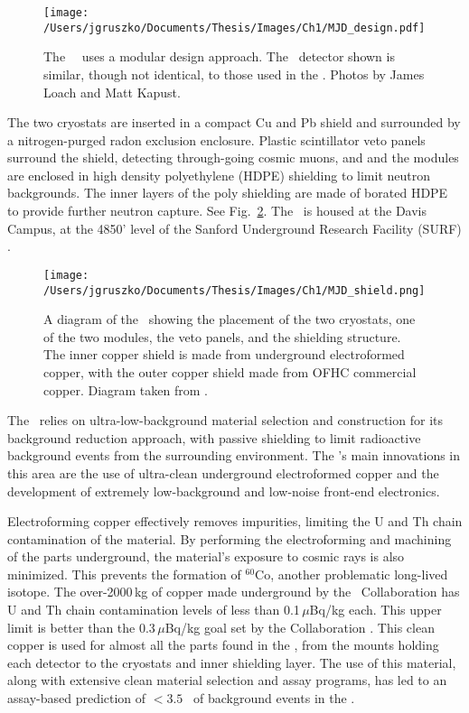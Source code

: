 \begin{figure}[t]
\centering
\texttt{[image: /Users/jgruszko/Documents/Thesis/Images/Ch1/MJD\_design.pdf]}
\caption[The modular elements of the \DEM\ design]{The \MJ\ \DEM\ uses a modular design approach. The \ppc\ detector shown is similar, though not identical, to those used in the \DEM. Photos by James Loach and Matt Kapust.}
\label{fig:MJ_modular}
\end{figure}

The two cryostats are inserted in a compact Cu and Pb shield and surrounded by a nitrogen-purged radon exclusion enclosure. Plastic scintillator veto panels surround the shield, detecting through-going cosmic muons, and and the modules are enclosed in high density polyethylene (HDPE) shielding to limit neutron backgrounds. The inner layers of the poly shielding are made of borated HDPE to provide further neutron capture. See Fig.~\ref{fig:MJD_shield}. The \DEM\ is housed at the Davis Campus, at the 4850' level of the Sanford Underground Research Facility (SURF) \cite{MJD2014}. 

\begin{figure}[t]
\centering
\texttt{[image: /Users/jgruszko/Documents/Thesis/Images/Ch1/MJD\_shield.png]}
\caption[A diagram of the \DEM\ shielding configuration]{A diagram of the \DEM\ showing the placement of the two cryostats, one of the two modules, the veto panels, and the shielding structure. The inner copper shield is made from underground electroformed copper, with the outer copper shield made from OFHC commercial copper. Diagram taken from \cite{MJD2014}.}
\label{fig:MJD_shield}
\end{figure}

The \DEM\ relies on ultra-low-background material selection and construction for its background reduction approach, with passive shielding to limit radioactive background events from the surrounding environment. The \DEM's main innovations in this area are the use of ultra-clean underground electroformed copper and the development of extremely low-background and low-noise front-end electronics. 

Electroforming copper effectively removes impurities, limiting the U and Th chain contamination of the material. By performing the electroforming and machining of the parts underground, the material's exposure to cosmic rays is also minimized. This prevents the formation of $^{60}$Co, another problematic long-lived isotope. The over-2000\,kg of copper made underground by the \MJ\ Collaboration has U and Th chain contamination levels of less than 0.1\,$\mu$Bq/kg each. This upper limit is better than the 0.3\,$\mu$Bq/kg goal set by the Collaboration \cite{MJD_assay}. This clean copper is used for almost all the parts found in the \DEM, from the mounts holding each detector to the cryostats and inner shielding layer. The use of this material, along with extensive clean material selection and assay programs, has led to an assay-based prediction of $< 3.5$ \cpRty\ of background events in the \DEM \cite{MJD_assay}. 

